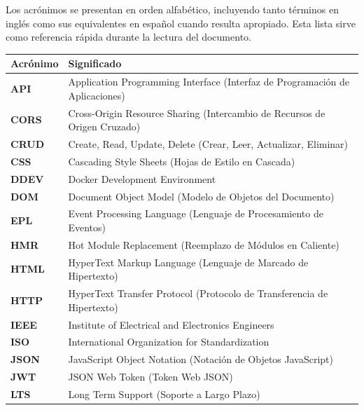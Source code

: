 \documentclass[12pt,a4paper,oneside]{report}
\begin{document}
Los acrónimos se presentan en orden alfabético, incluyendo tanto
términos en inglés como sus equivalentes en español cuando resulta
apropiado. Esta lista sirve como referencia rápida durante la lectura
del documento.

\begin{longtable}[]{@{}
  >{\raggedright\arraybackslash}p{}
  >{\raggedright\arraybackslash}p{}@{}}
\toprule\noalign{}
\begin{minipage}[b]{\linewidth}\raggedright
Acrónimo
\end{minipage} & \begin{minipage}[b]{\linewidth}\raggedright
Significado
\end{minipage} \\
\midrule\noalign{}
\endhead
\bottomrule\noalign{}
\endlastfoot
\textbf{API} & Application Programming Interface (Interfaz de
Programación de Aplicaciones) \\
\textbf{CORS} & Cross-Origin Resource Sharing (Intercambio de Recursos
de Origen Cruzado) \\
\textbf{CRUD} & Create, Read, Update, Delete (Crear, Leer, Actualizar,
Eliminar) \\
\textbf{CSS} & Cascading Style Sheets (Hojas de Estilo en Cascada) \\
\textbf{DDEV} & Docker Development Environment \\
\textbf{DOM} & Document Object Model (Modelo de Objetos del
Documento) \\
\textbf{EPL} & Event Processing Language (Lenguaje de Procesamiento de
Eventos) \\
\textbf{HMR} & Hot Module Replacement (Reemplazo de Módulos en
Caliente) \\
\textbf{HTML} & HyperText Markup Language (Lenguaje de Marcado de
Hipertexto) \\
\textbf{HTTP} & HyperText Transfer Protocol (Protocolo de Transferencia
de Hipertexto) \\
\textbf{IEEE} & Institute of Electrical and Electronics Engineers \\
\textbf{ISO} & International Organization for Standardization \\
\textbf{JSON} & JavaScript Object Notation (Notación de Objetos
JavaScript) \\
\textbf{JWT} & JSON Web Token (Token Web JSON) \\
\textbf{LTS} & Long Term Support (Soporte a Largo Plazo) \\

\end{longtable}
\end{document}
